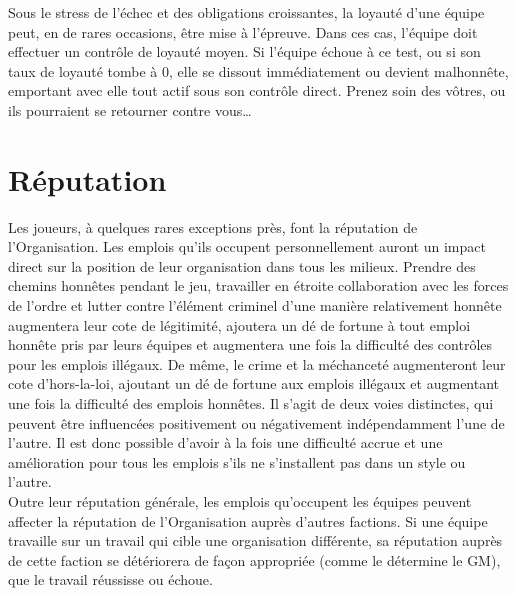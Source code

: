 \documentclass{article}
\begin{document}
Sous le stress de l'échec et des obligations croissantes, la loyauté d'une équipe peut, en de rares occasions, être mise à l'épreuve. Dans ces cas, l'équipe doit effectuer un contrôle de loyauté moyen. Si l'équipe échoue à ce test, ou si son taux de loyauté tombe à 0, elle se dissout immédiatement ou devient malhonnête, emportant avec elle tout actif sous son contrôle direct. Prenez soin des vôtres, ou ils pourraient se retourner contre vous\ldots

\section*{Réputation }
Les joueurs, à quelques rares exceptions près, font la réputation de l'Organisation. Les emplois qu'ils occupent personnellement auront un impact direct sur la position de leur organisation dans tous les milieux. Prendre des chemins honnêtes pendant le jeu, travailler en étroite collaboration avec les forces de l'ordre et lutter contre l'élément criminel d'une manière relativement honnête augmentera leur cote de légitimité, ajoutera un dé de fortune à tout emploi honnête pris par leurs équipes et augmentera une fois la difficulté des contrôles pour les emplois illégaux. De même, le crime et la méchanceté augmenteront leur cote d'hors-la-loi, ajoutant un dé de fortune aux emplois illégaux et augmentant une fois la difficulté des emplois honnêtes. Il s'agit de deux voies distinctes, qui peuvent être influencées positivement ou négativement indépendamment l'une de l'autre. Il est donc possible d'avoir à la fois une difficulté accrue et une amélioration pour tous les emplois s'ils ne s'installent pas dans un style ou l'autre.\\

Outre leur réputation générale, les emplois qu'occupent les équipes peuvent affecter la réputation de l'Organisation auprès d'autres factions. Si une équipe travaille sur un travail qui cible une organisation différente, sa réputation auprès de cette faction se détériorera de façon appropriée (comme le détermine le GM), que le travail réussisse ou échoue.
\end{document}
